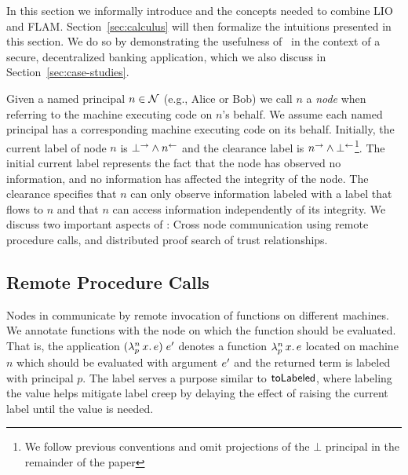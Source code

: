 In this section we informally introduce \lang{} and the concepts needed to combine LIO and FLAM. Section~\ref{sec:calculus} will then formalize the intuitions presented in this section. We do so by demonstrating the usefulness of \lang{}\ in the context of a secure, decentralized banking application, which we also discuss in Section~\ref{sec:case-studies}.

Given a named principal $n \in \mathcal{N}$ (e.g., Alice or Bob) we call $n$ a \emph{node} when referring to the machine executing code on $n$'s behalf. We assume each named principal has a corresponding machine executing code on its behalf. Initially, the current label of node $n$ is $\bot^{\rightarrow} \wedge n^{\leftarrow}$ and the clearance label is $n^{\rightarrow} \wedge \bot^{\leftarrow}$\footnote{We follow previous conventions \cite{Arden:2015:FA:2859845.2859998} and omit projections of the $\bot$ principal in the remainder of the paper}. The initial current label represents the fact that the node has observed no information, and no information has affected the integrity of the node. The clearance specifies that $n$ can only observe information labeled with a label that flows to $n$ and that $n$ can access information independently of its integrity. We discuss two important aspects of \lang: Cross node communication using remote procedure calls, and distributed proof search of trust relationships.

\subsection{Remote Procedure Calls}
Nodes in \lang{} communicate by remote invocation of functions on different machines. We annotate functions with the node on which the function should be evaluated. That is, the application $(\lambda^{n}_{p}\,x.\,e)\;e'$ denotes a function $\lambda^{n}_{p}\,x.\,e$ located on machine $n$ which should be evaluated with argument $e'$ and the returned term is labeled with principal $p$. The label serves a purpose similar to $\mathsf{toLabeled}$, where labeling the value helps mitigate label creep by delaying the effect of raising the current label until the value is needed.

